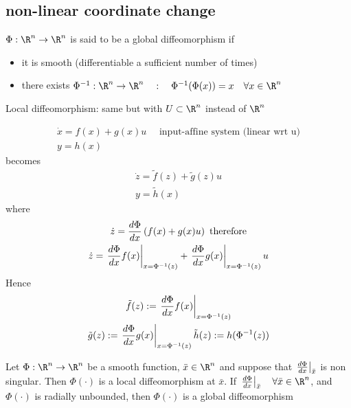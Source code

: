 \documentclass[english]{lectures}
\begin{document}
\subsection{non-linear coordinate change}
\begin{definition}[Diffeomorphism]
    $\Phi:\R^n\to\R^n$ is said to be a global diffeomorphism if
    \begin{itemize}
        \item it is smooth (differentiable a sufficient number of times)
        \item there exists $\Phi^{-1}: \R^n \to \R^n \quad :\quad \Phi^{-1}(\Phi(x))=x \quad \forall x\in\R^n$
    \end{itemize}
    Local diffeomorphism: same but with $U\subset\R^n$ instead of $\R^n$
\end{definition}
\begin{gather*}
    \dot{x}=f(x)+g(x)u \quad \text{ input-affine system (linear wrt u)}\\ 
    y=h(x)
\end{gather*}
becomes
\begin{gather*}
    \dot{z}=\tilde{f}(z)+\tilde{g}(z)u\\
    y=\tilde{h}(x)
\end{gather*}
where
\begin{gather*}
    \dot{z}=\frac{d\Phi}{dx}\left( f(x)+g(x)u \right) \text{ therefore}\\
    \dot{z}=\eval{\frac{d\Phi}{dx}f(x)}_{x=\Phi^{-1}(z)}+\eval{\frac{d\Phi}{dx}g(x)}_{x=\Phi^{-1}(z)}u
\end{gather*}
Hence
\begin{gather*}
    \tilde{f}(z):=\eval{\frac{d\Phi}{dx}f(x)}_{x=\Phi^{-1}(z)}\\
    \tilde{g}(z):=\eval{\frac{d\Phi}{dx}g(x)}_{x=\Phi^{-1}(z)}
    \tilde{h}(z):=h(\Phi^{-1}(z))
\end{gather*}

\begin{result}
    Let $\Phi:\R^n\to\R^n$ be a smooth function, $\bar{x}\in \R^n$ and suppose that $\eval{\frac{d\Phi}{dx}}_{\bar{x}}$ is non singular. Then $\Phi(\cdot)$ is a local diffeomorphism at $\bar{x}$. If $\eval{\frac{d\Phi}{dx}}_{\bar{x}} \quad \forall \bar{x} \in \R^n$, and $\Phi(\cdot)$ is radially unbounded, then $\Phi(\cdot)$ is a global diffeomorphism
\end{result}
\end{document}
